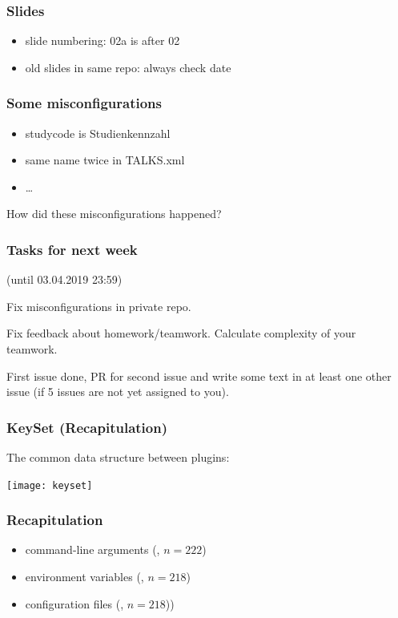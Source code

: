 \begin{frame}
	\frametitle{Slides}
	\begin{itemize}
	\item slide numbering: 02a is after 02
	\item old slides in same repo: always check date
	\end{itemize}
\end{frame}

\begin{frame}
	\frametitle{Some misconfigurations}
	\begin{itemize}
	\item studycode is Studienkennzahl
	\item same name twice in TALKS.xml
	\item \dots
	\end{itemize}

	\begin{task}
	How did these misconfigurations happened?
	\end{task}
\end{frame}

\begin{assignment}
	\frametitle{Tasks for next week}
	(until 03.04.2019 23:59)

	\begin{task}
	Fix misconfigurations in private repo.
	\end{task}

	\begin{task}
	Fix feedback about homework/teamwork.
	Calculate complexity of your teamwork.
	\end{task}

	\begin{task}
	First issue done, PR for second issue and write some text in at least one other issue (if 5 issues are not yet assigned to you).
	\end{task}
\end{assignment}


\begin{frame}
	\frametitle{KeySet (Recapitulation)}

	The common data structure between plugins:
	\vspace{1cm}

	\texttt{[image: keyset]}
\end{frame}

\begin{frame}
	\frametitle{Recapitulation}

	\methodQuestion{} 
	\pause
	\begin{itemize}
	\item command-line arguments (, $n=222$)
	\item environment variables (, $n=218$)
	\item configuration files (, $n=218$))
	\end{itemize}
\end{frame}

